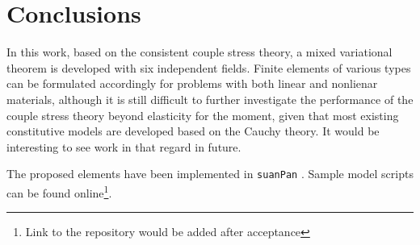 \documentclass[3p,sort&compress,11pt,fleqn]{elsarticle}
\begin{document}
\section{Conclusions}
In this work, based on the consistent couple stress theory, a mixed variational theorem is developed with six independent fields. Finite elements of various types can be formulated accordingly for problems with both linear and nonlienar materials, although it is still difficult to further investigate the performance of the couple stress theory beyond elasticity for the moment, given that most existing constitutive models are developed based on the Cauchy theory. It would be interesting to see work in that regard in future.

The proposed elements have been implemented in \texttt{suanPan} \citep{Chang2021}. Sample model scripts can be found online\footnote{Link to the repository would be added after acceptance}.

\end{document}
